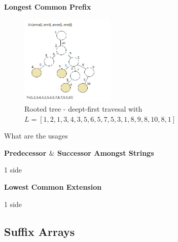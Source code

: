 \documentclass[12pt]{article} %
\begin{document}
\textbf{Longest Common Prefix}

\begin{figure}[H]
    \centering
    \includegraphics[width=0.4\textwidth]{suffixtree(speeling_anna)}
    \captionsetup{width=0.8\textwidth}
    \caption{Rooted tree - deept-first travesal with $L = [1,2,1,3,4,3,5,6,5,7,5,3,1,8,9,8,10,8,1]$}
    \label{fig:travesal_anna}
\end{figure}

What are the usages

\textbf{Predecessor $\&$ Successor Amongst Strings}

1 side

\textbf{Lowest Common Extension}

1 side

\subsection{Suffix Arrays}
\end{document}
